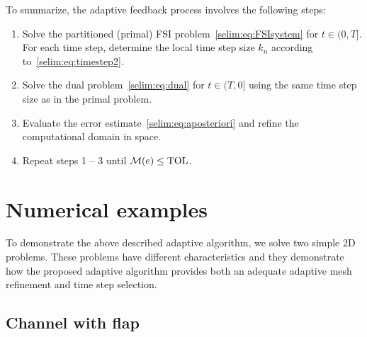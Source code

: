 To summarize, the adaptive feedback process involves the following steps:
\begin{enumerate}
\item
Solve the partitioned (primal) FSI problem~\eqref{selim:eq:FSIsystem} for
$t\in(0,T]$. For each time step, determine the local time step size $k_n$
  according to~\eqref{selim:eq:timestep2}.
\item
Solve the dual problem~\eqref{selim:eq:dual} for $t\in(T,0]$ using the
  same time step size as in the primal problem.
\item
Evaluate the error estimate~\eqref{selim:eq:aposteriori} and refine
the computational domain in space.
\item
Repeat steps 1 -- 3 until $\mathcal{M}(e)\leq \mathrm{TOL}$.
\end{enumerate}
\section{Numerical examples}

To demonstrate the above described adaptive algorithm, we solve two
simple 2D problems. These problems have different characteristics and
they demonstrate how the proposed adaptive algorithm provides both an
adequate adaptive mesh refinement and time step selection.

\subsection{Channel with flap}

